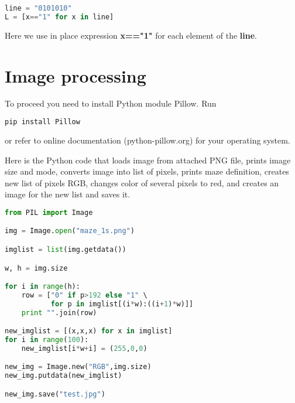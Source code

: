 \begin{lstlisting}[language=Python,style=codelst2,caption={Python: string element by element}]
line = "0101010"
L = [x=="1" for x in line]
\end{lstlisting}
Here we use in place expression \textbf{x=="1"} 
for each element of the \textbf{line}.

\section{Image processing}

To proceed you need to install Python module Pillow. Run

\begin{lstlisting}[language=bash,frame=single]
pip install Pillow
\end{lstlisting}
or refer to online documentation (python-pillow.org) for your
operating system.

Here is the Python code that loads image from attached PNG file,
prints image size and mode,
converts image into list of pixels, prints maze definition,
creates new list of pixels RGB, changes color of several pixels
to red, and creates an image for the new list and saves it.

\begin{lstlisting}[language=Python,style=codelst,caption={Python: image operations}]
from PIL import Image

img = Image.open("maze_1s.png")

imglist = list(img.getdata())

w, h = img.size

for i in range(h):
    row = ["0" if p>192 else "1" \
           for p in imglist[(i*w):((i+1)*w)]]
    print "".join(row)

new_imglist = [(x,x,x) for x in imglist]
for i in range(100):
    new_imglist[i*w+i] = (255,0,0)

new_img = Image.new("RGB",img.size)
new_img.putdata(new_imglist)

new_img.save("test.jpg")
\end{lstlisting}

